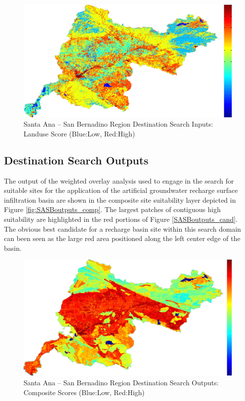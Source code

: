        \begin{figure}[!h]
            \begin{center}
            \includegraphics[width=5.5in]{figures/SanBernadino_Search_Landuse.png}   
            \caption{Santa Ana -- San Bernadino Region Destination Search Inputs: Landuse Score (Blue:Low, Red:High)}
            \label{fig:SASBdsinputs_landuse}
            \end{center}
        \end{figure}
    
    \subsection{Destination Search Outputs}
    
The output of the weighted overlay analysis used to engage in the search for suitable sites for the application of the artificial groundwater recharge surface infiltration basin are shown in the composite site suitability layer depicted in Figure \ref{fig:SASBoutputs_comp}. The largest patches of contiguous high suitability are highlighted in the red portions of Figure \ref{SASBoutputs_cand}. The obvious best candidate for a recharge basin site within this search domain can been seen as the large red area positioned along the left center edge of the basin.
    
        \begin{figure}[!h]
            \begin{center}
            \includegraphics[width=5.5in]{figures/SanBernadino_Search_Composite.png}   
            \caption{Santa Ana -- San Bernadino Region Destination Search Outputs: Composite Scores (Blue:Low, Red:High)}
            \label{fig:SASBdsoutputs_comp}
            \end{center}
        \end{figure}
        
